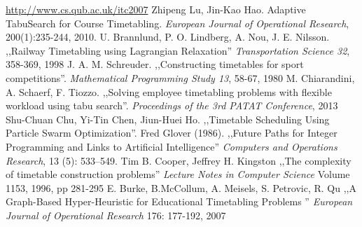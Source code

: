 \documentclass[11pt]{report}
\begin{document}
\begin{thebibliography}{2}
 \url{http://www.cs.qub.ac.uk/itc2007}
 Zhipeng Lu, Jin-Kao Hao. Adaptive TabuSearch for Course Timetabling.  \emph{European Journal of Operational Research}, 200(1):235-244, 2010.
 U. Brannlund, P. O. Lindberg, A. Nou, J. E. Nilsson. ,,Railway Timetabling using Lagrangian Relaxation'' \emph{Transportation Science 32}, 358-369, 1998
 J. A. M. Schreuder. ,,Constructing timetables for sport competitions''. \emph{Mathematical Programming Study 13}, 58-67, 1980
 M. Chiarandini, A. Schaerf, F. Tiozzo. ,,Solving employee timetabling problems with flexible workload using tabu search''. \emph{Proceedings of the 3rd PATAT Conference}, 2013
 Shu-Chuan Chu, Yi-Tin Chen, Jiun-Huei Ho. ,,Timetable Scheduling Using Particle Swarm Optimization''. 
 Fred Glover (1986). ,,Future Paths for Integer Programming and Links to Artificial Intelligence'' \emph{Computers and Operations Research}, 13 (5): 533–549.
 Tim B. Cooper, Jeffrey H. Kingston ,,The complexity of timetable construction problems''  \emph{Lecture Notes in Computer Science} Volume 1153, 1996, pp 281-295 
  E. Burke, B.McCollum, A. Meisels, S. Petrovic, R. Qu ,,A Graph-Based Hyper-Heuristic for Educational Timetabling Problems '' \emph{European Journal of Operational Research} 176: 177-192, 2007


\end{thebibliography}
\end{document}
